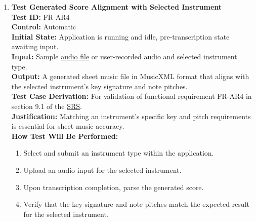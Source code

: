 \documentclass[12pt, titlepage]{article}
\begin{document}
\begin{enumerate}
  \item \textbf{Test Generated Score Alignment with Selected Instrument} \\
    \newline
    \textbf{Test ID:} FR-AR4 \\
    \textbf{Control:} Automatic \\
    \textbf{Initial State:} Application is running and idle, pre-transcription state awaiting input. \\
    \textbf{Input:} Sample \href{https://github.com/emilyperica/ScoreGen/blob/main/test/TestingDatasets/piano-samples/sample-scales/c-major-scale-on-treble-clef.wav}{audio file} or user-recorded audio and selected instrument type. \\
    \textbf{Output:} A generated sheet music file in MusicXML format that aligns with the selected instrument’s key signature 
    and note pitches. \\
    \textbf{Test Case Derivation:} For validation of functional requirement FR-AR4 in section 9.1 of the 
    \href{https://github.com/emilyperica/ScoreGen/blob/main/docs/SRS-Volere/SRS.pdf}{SRS}.\\
    \textbf{Justification:} Matching an instrument's specific key and pitch requirements is essential for sheet music accuracy. \\
    \textbf{How Test Will Be Performed:}
    \begin{enumerate}
        \item Select and submit an instrument type within the application.
        \item Upload an audio input for the selected instrument.
        \item Upon transcription completion, parse the generated score.
        \item Verify that the key signature and note pitches match the expected result for the selected instrument.
    \end{enumerate}
  \end{enumerate}
\end{document}
